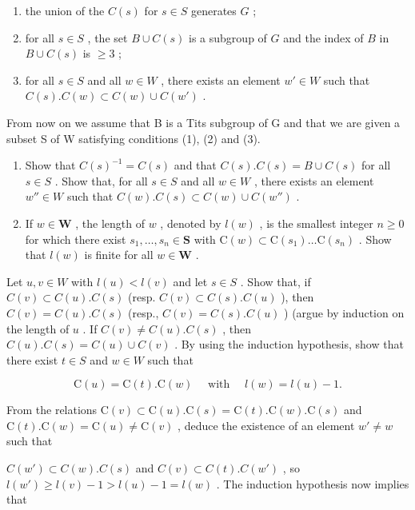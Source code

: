 \begin{enumerate}
\def\labelenumi{(\arabic{enumi})}
\item
  the union of the \(C(s)\) for \(s \in S\) generates \(G\) ;
\item
  for all \(s \in S\) , the set \(B \cup C(s)\) is a subgroup of \(G\) and the index of \(B\) in \(B \cup C(s)\) is \(\geqslant 3\) ;
\item
  for all \(s \in S\) and all \(w \in W\) , there exists an element \(w' \in W\) such that \(C(s).C(w) \subset C(w) \cup C(w')\) .
\end{enumerate}

From now on we assume that B is a Tits subgroup of G and that we are given a subset S of W satisfying conditions (1), (2) and (3).

\begin{enumerate}
\def\labelenumi{\alph{enumi})}
\item
  Show that \(C(s)^{-1} = C(s)\) and that \(C(s).C(s) = B \cup C(s)\) for all \(s \in S\) . Show that, for all \(s \in S\) and all \(w \in W\) , there exists an element \(w'' \in W\) such that \(C(w).C(s) \subset C(w) \cup C(w'')\) .
\item
  If \(w \in \mathbf{W}\) , the length of \(w\) , denoted by \(l(w)\) , is the smallest integer \(n \geqslant 0\) for which there exist \(s_1, \ldots, s_n \in \mathbf{S}\) with \(\mathrm{C}(w) \subset \mathrm{C}(s_1) \ldots \mathrm{C}(s_n)\) . Show that \(l(w)\) is finite for all \(w \in \mathbf{W}\) .
\end{enumerate}

Let \(u, v \in W\) with \(l(u) < l(v)\) and let \(s \in S\) . Show that, if \(C(v) \subset C(u).C(s)\) (resp. \(C(v) \subset C(s).C(u)\) ), then \(C(v) = C(u).C(s)\) (resp., \(C(v) = C(s).C(u)\) ) (argue by induction on the length of \(u\) . If \(C(v) \neq C(u).C(s)\) , then \(C(u).C(s) = C(u) \cup C(v)\) . By using the induction hypothesis, show that there exist \(t \in S\) and \(w \in W\) such that

\[
\mathrm{C} (u) = \mathrm{C} (t). \mathrm{C} (w) \quad \text { with } \quad l (w) = l (u) - 1.
\]

From the relations \(\mathrm{C}(v) \subset \mathrm{C}(u).\mathrm{C}(s) = \mathrm{C}(t).\mathrm{C}(w).\mathrm{C}(s)\) and \(\mathrm{C}(t).\mathrm{C}(w) = \mathrm{C}(u) \neq \mathrm{C}(v)\) , deduce the existence of an element \(w' \neq w\) such that

\(C(w') \subset C(w).C(s)\) and \(C(v) \subset C(t).C(w')\) , so \(l(w') \geqslant l(v) - 1 > l(u) - 1 = l(w)\) . The induction hypothesis now implies that

